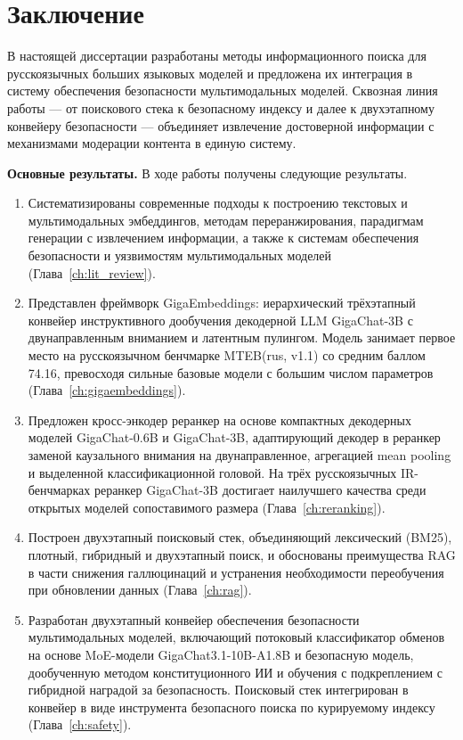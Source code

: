 \chapter*{Заключение}

В настоящей диссертации разработаны методы информационного поиска для русскоязычных больших языковых моделей и предложена их интеграция в систему обеспечения безопасности мультимодальных моделей. Сквозная линия работы --- от поискового стека к безопасному индексу и далее к двухэтапному конвейеру безопасности --- объединяет извлечение достоверной информации с механизмами модерации контента в единую систему.

\textbf{Основные результаты.} В ходе работы получены следующие результаты.
\begin{enumerate}
    \item Систематизированы современные подходы к построению текстовых и мультимодальных эмбеддингов, методам переранжирования, парадигмам генерации с извлечением информации, а также к системам обеспечения безопасности и уязвимостям мультимодальных моделей (Глава~\ref{ch:lit_review}).
    \item Представлен фреймворк GigaEmbeddings: иерархический трёхэтапный конвейер инструктивного дообучения декодерной LLM GigaChat-3B с двунаправленным вниманием и латентным пулингом. Модель занимает первое место на русскоязычном бенчмарке MTEB(rus, v1.1) со средним баллом 74.16, превосходя сильные базовые модели с большим числом параметров (Глава~\ref{ch:gigaembeddings}).
    \item Предложен кросс-энкодер реранкер на основе компактных декодерных моделей GigaChat-0.6B и GigaChat-3B, адаптирующий декодер в реранкер заменой каузального внимания на двунаправленное, агрегацией mean pooling и выделенной классификационной головой. На трёх русскоязычных IR-бенчмарках реранкер GigaChat-3B достигает наилучшего качества среди открытых моделей сопоставимого размера (Глава~\ref{ch:reranking}).
    \item Построен двухэтапный поисковый стек, объединяющий лексический (BM25), плотный, гибридный и двухэтапный поиск, и обоснованы преимущества RAG в части снижения галлюцинаций и устранения необходимости переобучения при обновлении данных (Глава~\ref{ch:rag}).
    \item Разработан двухэтапный конвейер обеспечения безопасности мультимодальных моделей, включающий потоковый классификатор обменов на основе MoE-модели GigaChat3.1-10B-A1.8B и безопасную модель, дообученную методом конституционного ИИ и обучения с подкреплением с гибридной наградой за безопасность. Поисковый стек интегрирован в конвейер в виде инструмента безопасного поиска по курируемому индексу (Глава~\ref{ch:safety}).
\end{enumerate}

